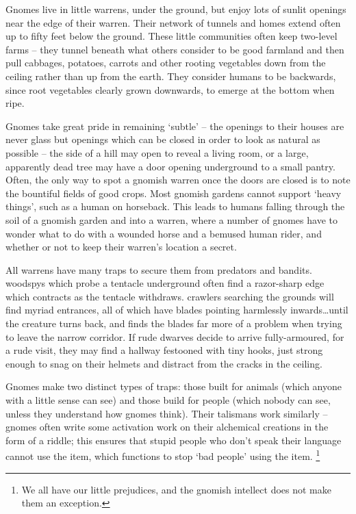 \begin{multicols}{2}
\renewcommand\npcsymbol{\Gn}


\noindent
Gnomes live in little warrens, under the ground, but enjoy lots of sunlit openings near the edge of their warren.
Their network of tunnels and homes extend often up to fifty feet below the ground.
These little communities often keep two-level farms -- they tunnel beneath what others consider to be good farmland and then pull cabbages, potatoes, carrots and other rooting vegetables down from the ceiling rather than up from the earth.
They consider humans to be backwards, since root vegetables clearly grown downwards, to emerge at the bottom when ripe.

Gnomes take great pride in remaining `subtle' -- the openings to their houses are never glass but openings which can be closed in order to look as natural as possible -- the side of a hill may open to reveal a living room, or a large, apparently dead tree may have a door opening underground to a small pantry.
Often, the only way to spot a gnomish warren once the doors are closed is to note the bountiful fields of good crops.
Most gnomish gardens cannot support `heavy things', such as a human on horseback.
This leads to humans falling through the soil of a gnomish garden and into a warren, where a number of gnomes have to wonder what to do with a wounded horse and a bemused human rider, and whether or not to keep their warren's location a secret.

All warrens have many traps to secure them from predators and bandits.
\Glspl{woodspy} which probe a tentacle underground often find a razor-sharp edge which contracts as the tentacle withdraws.
\Glspl{crawler} searching the grounds will find myriad entrances, all of which have blades pointing harmlessly inwards\ldots until the creature turns back, and finds the blades far more of a problem when trying to leave the narrow corridor.
If rude dwarves decide to arrive fully-armoured, for a rude visit, they may find a hallway festooned with tiny hooks, just strong enough to snag on their helmets and distract from the cracks in the ceiling.

Gnomes make two distinct types of traps: those built for animals (which anyone with a little sense can see) and those build for people (which nobody can see, unless they understand how gnomes think).
Their \glspl{talisman} work similarly -- gnomes often write some activation work on their alchemical creations in the form of a riddle; this ensures that stupid people who don't speak their language cannot use the item, which functions to stop `bad people' using the item.%
\footnote{We all have our little prejudices, and the gnomish intellect does not make them an exception.}


\end{multicols}
